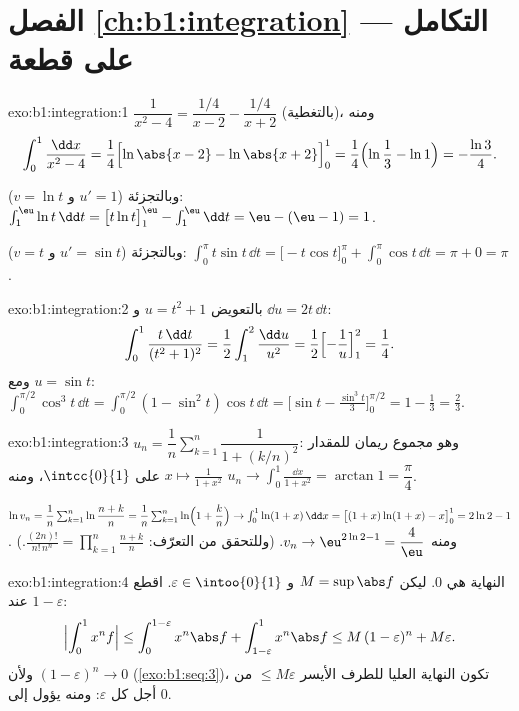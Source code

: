 \section*{الفصل \ref{ch:b1:integration} --- التكامل على قطعة}

\begin{solution}{exo:b1:integration:1}
$\dfrac{1}{x^2-4} = \dfrac{1/4}{x - 2} - \dfrac{1/4}{x+2}$
(بالتغطية)، ومنه
\[
\int_0^1 \frac{\dd x}{x^2 - 4}
= \frac14\Bigl[\ln\abs{x-2} - \ln\abs{x+2}\Bigr]_0^1
= \frac14\Bigl(\ln\frac{1}{3} - \ln 1\Bigr) = -\frac{\ln 3}{4}.
\]

وبالتجزئة ($u' = 1$ و $v = \ln t$): $\int_1^{\eu} \ln t\,\dd t =
\bigl[t\ln t\bigr]_1^{\eu} - \int_1^{\eu} \dd t = \eu - (\eu - 1) =
1$.

وبالتجزئة ($u' = \sin t$ و $v = t$): $\int_0^\pi t\sin t\,\dd t =
\bigl[-t\cos t\bigr]_0^\pi + \int_0^\pi \cos t\,\dd t = \pi + 0 =
\pi$.
\end{solution}

\begin{solution}{exo:b1:integration:2}
بالتعويض $u = t^2 + 1$ و $\dd u = 2t\,\dd t$:
\[
\int_0^1 \frac{t\,\dd t}{(t^2+1)^2}
= \frac12 \int_1^2 \frac{\dd u}{u^2}
= \frac12\Bigl[-\frac1u\Bigr]_1^2 = \frac14 .
\]
ومع $u = \sin t$: $\int_0^{\pi/2} \cos^3 t\,\dd t = \int_0^{\pi/2}
(1 - \sin^2 t)\cos t\,\dd t = \bigl[\sin t - \frac{\sin^3
t}{3}\bigr]_0^{\pi/2} = 1 - \frac13 = \frac23$.
\end{solution}

\begin{solution}{exo:b1:integration:3}
$u_n = \dfrac1n \sum_{k=1}^{n} \dfrac{1}{1 + (k/n)^2}$: وهو مجموع ريمان
للمقدار $x \mapsto \frac{1}{1+x^2}$ على $\intcc{0}{1}$، ومنه $u_n \to
\int_0^1 \frac{\dd x}{1+x^2} = \arctan 1 = \dfrac\pi4$.

$\ln v_n = \dfrac1n \sum_{k=1}^{n} \ln\dfrac{n+k}{n} = \dfrac 1n
\sum_{k=1}^n \ln\Bigl(1 + \dfrac kn\Bigr) \to \int_0^1 \ln(1+x)\,\dd
x = \bigl[(1+x)\ln(1+x) - x\bigr]_0^1 = 2\ln 2 - 1$. ومنه $v_n \to
\eu^{2\ln 2 - 1} = \dfrac 4\eu$. (وللتحقق من التعرّف:
$\frac{(2n)!}{n!\,n^n} = \prod_{k=1}^{n} \frac{n+k}{n}$.)
\end{solution}

\begin{solution}{exo:b1:integration:4}
النهاية هي $0$. ليكن $M = \sup \abs f$ و $\varepsilon \in
\intoo{0}{1}$. اقطع عند $1 - \varepsilon$:
\[
\Bigl| \int_0^1 x^n f \Bigr|
\leq \int_0^{1 - \varepsilon} x^n \abs f + \int_{1-\varepsilon}^1
x^n \abs f
\leq M\,(1-\varepsilon)^n + M\varepsilon .
\]
ولأن $(1 - \varepsilon)^n \to 0$ (\cref{exo:b1:seq:3})، تكون النهاية العليا
للطرف الأيسر $\leq M\varepsilon$ من أجل كل $\varepsilon$:
ومنه يؤول  إلى $0$.
\end{solution}

